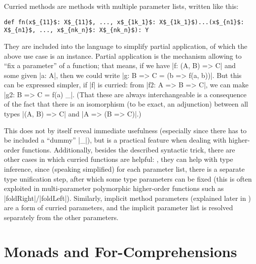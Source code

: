 Curried methods are methods with multiple parameter lists, written like this:
\begin{lstlisting}[mathescape]
  def fn(x$_{11}$: X$_{11}$, ..., x$_{1k_1}$: X$_{1k_1}$)...(x$_{n1}$: X$_{n1}$, ..., x$_{nk_n}$: X$_{nk_n}$): Y
\end{lstlisting}
They are included into the language to simplify partial application, of which the above use case is
an instance. Partial application is the mechanism allowing to \enquote{fix a parameter} of a
function; that means, if we have |f: (A, B) => C| and some given |a: A|, then we could write %
|g: B => C = (b => f(a, b))|. But this can be expressed simpler, if |f| is curried: from %
|f2: A => B => C|, we can make |g2: B => C = f(a) _|. (That these are always interchangeable is a
consequence of the fact that there is an isomorphism (to be exact, an adjunction) between all types
|(A, B) => C| and |A => (B => C)|.)

This does not by itself reveal immediate usefulness (especially since there has to be included a
\enquote{dummy} |_|), but is a practical feature when dealing with higher-order
functions. Additionally, besides the described syntactic trick, there are other cases in which
curried functions are helpful: \eg, they can help with type inference, since (speaking simplified)
for each parameter list, there is a separate type unification step, after which some type parameters
can be fixed (this is often exploited in multi-parameter polymorphic higher-order functions such as
|foldRight|/|foldLeft|). Similarly, implicit method parameters (explained later in
) are a form of curried parameters, and the implicit parameter list is
resolved separately from the other parameters.


\section{Monads and For-Comprehensions}
\label{sec:monads}

